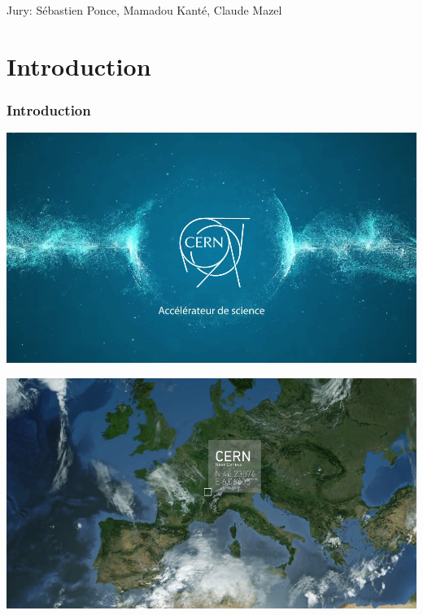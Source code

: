 \documentclass{beamer}
\begin{document}
\begin{frame}
    \maketitle

    Jury: Sébastien Ponce, Mamadou Kanté, Claude Mazel
\end{frame}


\part{Introduction}
\section*{Introduction}

\begin{frame}
    \includegraphics[width=\textwidth]{video/CERN.png}
\end{frame}

\begin{frame}
    \includegraphics[width=\textwidth]{video/Geneva.png}
\end{frame}
\end{document}
